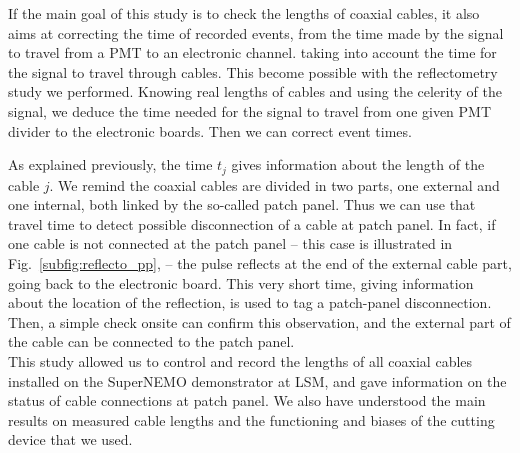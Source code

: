 If the main goal of this study is to check the lengths of coaxial cables, it also aims at correcting the time of recorded events, from the time made by the signal to travel from a PMT to an electronic channel.
taking into account the time for the signal to travel through cables.
This become possible with the reflectometry study we performed.
Knowing real lengths of cables and using the celerity of the signal, we deduce the time needed for the signal to travel from one given PMT divider to the electronic boards.
Then we can correct event times.

As explained previously, the time $t_{j}$ gives information about the length of the cable $j$.
We remind the coaxial cables are divided in two parts, one external and one internal, both linked by the so-called patch panel.
Thus we can use that travel time to detect possible disconnection of a cable at patch panel.
In fact, if one cable is not connected at the patch panel -- this case is illustrated in Fig.~\ref{subfig:reflecto_pp}, -- the pulse reflects at the end of the external cable part, going back to the electronic board.
This very short time, giving information about the location of the reflection, is used to tag a patch-panel disconnection.
Then, a simple check onsite can confirm this observation, and the external part of the cable can be connected to the patch panel.\\

This study allowed us to control and record the lengths of all coaxial cables installed on the SuperNEMO demonstrator at LSM, and gave information on the status of cable connections at patch panel.
We also have understood the main results on measured cable lengths and the functioning and biases of the cutting device that we used.

